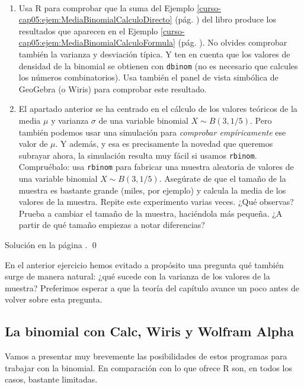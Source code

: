 \documentclass[10pt,a4paper]{article}\usepackage[]{graphicx}\usepackage[]{color}
\begin{document}
\begin{ejercicio}
\label{tut05:ejercicio07}
\quad\\
\begin{enumerate}
  \item Usa R para comprobar que la suma del Ejemplo \ref{curso-cap05:ejem:MediaBinomialCalculoDirecto} (pág. \pageref{curso-cap05:ejem:MediaBinomialCalculoDirecto}) del libro produce los resultados que aparecen en el Ejemplo \ref{curso-cap05:ejem:MediaBinomialCalculoFormula} (pág. \pageref{curso-cap05:ejem:MediaBinomialCalculoFormula}). No olvides comprobar también la varianza y desviación típica. Y ten en cuenta que los valores de densidad de la binomial se obtienen con {\tt dbinom} (no es necesario que calcules los números combinatorios).
      Usa también el panel de vista simbólica de GeoGebra (o Wiris) para comprobar este resultado.

  \item El apartado anterior se ha centrado en el cálculo de los valores teóricos de la media $\mu$ y varianza $\sigma$ de una variable binomial $X\sim B(3, 1/5)$. Pero también podemos usar una simulación para {\em comprobar empíricamente} ese valor de $\mu$. Y además, y esa es precisamente la novedad que queremos subrayar ahora, la simulación resulta muy fácil si usamos {\tt rbinom}. Compruébalo: usa {\tt rbinom} para fabricar una muestra aleatoria de valores de una variable binomial $X\sim B(3, 1/5)$. Asegúrate de que el tamaño de la muestra es bastante grande (miles, por ejemplo) y calcula la media de los valores de la muestra. Repite este experimento varias veces. ¿Qué observas? Prueba a cambiar el tamaño de la muestra, haciéndola más pequeña. ¿A partir de qué tamaño empiezas a notar diferencias?
\end{enumerate}
Solución en la página \pageref{tut05:ejercicio07:sol}.
\qed
\end{ejercicio}

En el anterior ejercicio hemos evitado a propósito una pregunta qué también surge de manera natural: ¿qué sucede con la varianza de los valores de la muestra? Preferimos esperar a que la teoría del capítulo avance un poco antes de volver sobre esta pregunta.


\subsection{La binomial con Calc, Wiris y Wolfram Alpha}

Vamos a presentar muy brevemente las posibilidades de estos programas para trabajar con la binomial. En comparación con lo que ofrece R son, en todos los casos, bastante limitadas.
\end{document}
